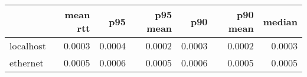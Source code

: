 \begin{tabular}{l|rrrrrr}
\rowcolor{gray!50}
 & mean rtt & p95 & p95 mean & p90 & p90 mean & median\\\hline
localhost & 0.0003 & 0.0004 & 0.0002 & 0.0003 & 0.0002 & 0.0003 \\
ethernet & 0.0005 & 0.0006 & 0.0005 & 0.0006 & 0.0005 & 0.0005 \\
\end{tabular}
